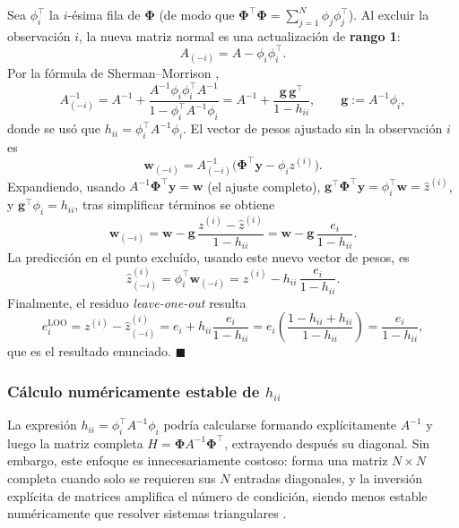 \documentclass[11pt,a4paper]{article}
\newcommand{\Phimat}{\boldsymbol{\Phi}}
\newcommand{\wvec}{\mathbf{w}}
\newcommand{\yvec}{\mathbf{y}}
\begin{document}
Sea $\phi_i^{\!\top}$ la $i$-\'esima fila de $\Phimat$ (de modo que
$\Phimat^{\!\top}\Phimat = \sum_{j=1}^N \phi_j\phi_j^{\!\top}$). Al excluir la
observaci\'on $i$, la nueva matriz normal es una actualizaci\'on de
\textbf{rango 1}:
\[
A_{(-i)} = A - \phi_i \phi_i^{\!\top}.
\]
Por la f\'ormula de Sherman--Morrison \cite{golub2013},
\[
A_{(-i)}^{-1} = A^{-1} + \frac{A^{-1}\phi_i\phi_i^{\!\top} A^{-1}}
{1 - \phi_i^{\!\top} A^{-1}\phi_i}
= A^{-1} + \frac{\mathbf{g}\,\mathbf{g}^{\!\top}}{1-h_{ii}}, \qquad
\mathbf{g} := A^{-1}\phi_i,
\]
donde se us\'o que $h_{ii} = \phi_i^{\!\top} A^{-1}\phi_i$. El vector de
pesos ajustado sin la observaci\'on $i$ es
\[
\wvec_{(-i)} = A_{(-i)}^{-1}\Big(\Phimat^{\!\top}\yvec - \phi_i z^{(i)}\Big).
\]
Expandiendo, usando $A^{-1}\Phimat^{\!\top}\yvec = \wvec$ (el ajuste completo),
$\mathbf{g}^{\!\top}\Phimat^{\!\top}\yvec = \phi_i^{\!\top}\wvec = \hat
z^{(i)}$, y $\mathbf{g}^{\!\top}\phi_i = h_{ii}$, tras simplificar t\'erminos
se obtiene
\[
\wvec_{(-i)} = \wvec - \mathbf{g}\,\frac{z^{(i)}-\hat z^{(i)}}{1-h_{ii}}
= \wvec - \mathbf{g}\,\frac{e_i}{1-h_{ii}} .
\]
La predicci\'on en el punto exclu\'ido, usando este nuevo vector de pesos, es
\[
\hat z^{(i)}_{(-i)} = \phi_i^{\!\top}\wvec_{(-i)}
= \hat z^{(i)} - h_{ii}\,\frac{e_i}{1-h_{ii}} .
\]
Finalmente, el residuo \emph{leave-one-out} resulta
\[
e_i^{\text{LOO}} = z^{(i)} - \hat z^{(i)}_{(-i)}
= e_i + h_{ii}\frac{e_i}{1-h_{ii}}
= e_i\left(\frac{1-h_{ii}+h_{ii}}{1-h_{ii}}\right)
= \frac{e_i}{1-h_{ii}},
\]
que es el resultado enunciado. $\blacksquare$

\subsubsection{C\'alculo num\'ericamente estable de $h_{ii}$}
\label{subsec:cholesky}

La expresi\'on $h_{ii} = \phi_i^{\!\top} A^{-1}\phi_i$ podr\'ia calcularse
formando expl\'icitamente $A^{-1}$ y luego la matriz completa $H = \Phimat
A^{-1}\Phimat^{\!\top}$, extrayendo despu\'es su diagonal. Sin embargo, este
enfoque es innecesariamente costoso: forma una matriz $N\times N$ completa
cuando solo se requieren sus $N$ entradas diagonales, y la inversi\'on
expl\'icita de matrices amplifica el n\'umero de condici\'on, siendo menos
estable num\'ericamente que resolver sistemas triangulares
\cite{golub2013,trefethen1997}.
\end{document}
